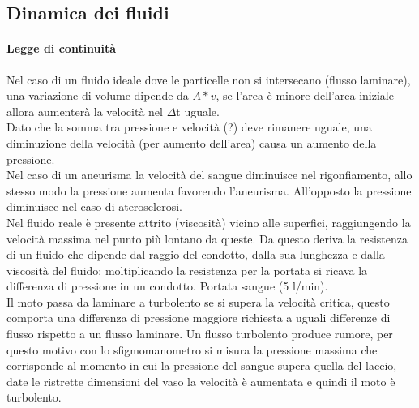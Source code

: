 \documentclass[10pt]{article}
\begin{document}
\subsection*{Dinamica dei fluidi}
\paragraph*{Legge di continuità} Nel caso di un fluido ideale dove le particelle non si intersecano (flusso laminare), una variazione di volume dipende da $A*v$, se l'area è minore dell'area iniziale allora aumenterà la velocità nel $\Delta$t uguale.\\
Dato che la somma tra pressione e velocità (?) deve rimanere uguale, una diminuzione della velocità (per aumento dell'area) causa un aumento della pressione. \\
Nel caso di un aneurisma la velocità del sangue diminuisce nel rigonfiamento, allo stesso modo la pressione aumenta favorendo l'aneurisma. All'opposto la pressione diminuisce nel caso di aterosclerosi.\\
Nel fluido reale è presente attrito (viscosità) vicino alle superfici, raggiungendo la velocità massima nel punto più lontano da queste. Da questo deriva la resistenza di un fluido che dipende dal raggio del condotto, dalla sua lunghezza e dalla viscosità del fluido; moltiplicando la resistenza per la portata si ricava la differenza di pressione in un condotto. Portata sangue (5 l/min).\\
Il moto passa da laminare a turbolento se si supera la velocità critica, questo comporta una differenza di pressione maggiore richiesta a uguali differenze di flusso rispetto a un flusso laminare. Un flusso turbolento produce rumore, per questo motivo con lo sfigmomanometro si misura la pressione massima che corrisponde al momento in cui la pressione del sangue supera quella del laccio, date le ristrette dimensioni del vaso la velocità è aumentata e quindi il moto è turbolento. 
\end{document}
